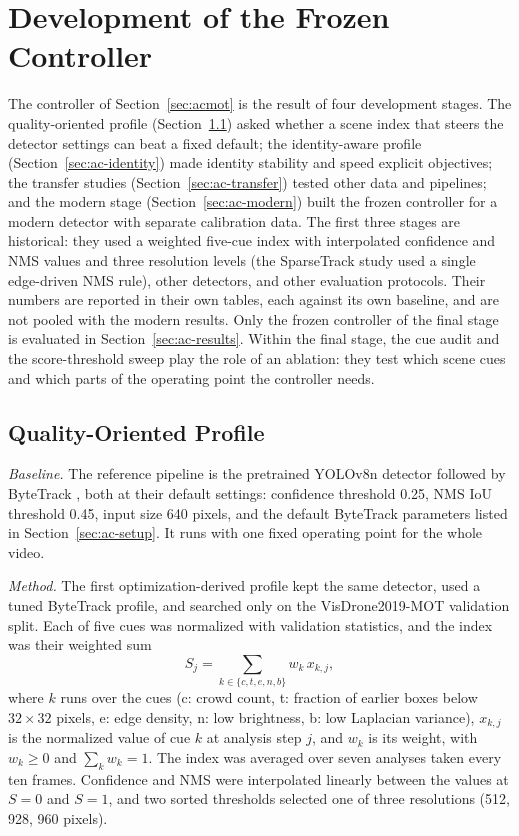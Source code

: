 \section{Development of the Frozen Controller}\label{sec:ac-dev}
The controller of Section~\ref{sec:acmot} is the result of four development stages. The quality-oriented profile (Section~\ref{sec:ac-quality}) asked whether a scene index that steers the detector settings can beat a fixed default; the identity-aware profile (Section~\ref{sec:ac-identity}) made identity stability and speed explicit objectives; the transfer studies (Section~\ref{sec:ac-transfer}) tested other data and pipelines; and the modern stage (Section~\ref{sec:ac-modern}) built the frozen controller for a modern detector with separate calibration data. The first three stages are historical: they used a weighted five-cue index with interpolated confidence and NMS values and three resolution levels (the SparseTrack study used a single edge-driven NMS rule), other detectors, and other evaluation protocols. Their numbers are reported in their own tables, each against its own baseline, and are not pooled with the modern results. Only the frozen controller of the final stage is evaluated in Section~\ref{sec:ac-results}. Within the final stage, the cue audit and the score-threshold sweep play the role of an ablation: they test which scene cues and which parts of the operating point the controller needs.

\subsection{Quality-Oriented Profile}\label{sec:ac-quality}
\emph{Baseline.} The reference pipeline is the pretrained YOLOv8n detector \cite{jocher2023yolov8} followed by ByteTrack \cite{zhang2022bytetrack}, both at their default settings: confidence threshold 0.25, NMS IoU threshold 0.45, input size 640 pixels, and the default ByteTrack parameters listed in Section~\ref{sec:ac-setup}. It runs with one fixed operating point for the whole video.

\emph{Method.} The first optimization-derived profile kept the same detector, used a tuned ByteTrack profile, and searched only on the VisDrone2019-MOT validation split. Each of five cues was normalized with validation statistics, and the index was their weighted sum
\begin{equation}
S_j=\sum_{k\in\{c,t,e,n,b\}}w_k\,x_{k,j},
\label{eq:ac-histsci}
\end{equation}
where $k$ runs over the cues (c: crowd count, t: fraction of earlier boxes below $32\times32$ pixels, e: edge density, n: low brightness, b: low Laplacian variance), $x_{k,j}$ is the normalized value of cue $k$ at analysis step $j$, and $w_k$ is its weight, with $w_k\geq0$ and $\sum_k w_k=1$. The index was averaged over seven analyses taken every ten frames. Confidence and NMS were interpolated linearly between the values at $S=0$ and $S=1$, and two sorted thresholds selected one of three resolutions (512, 928, 960 pixels).


